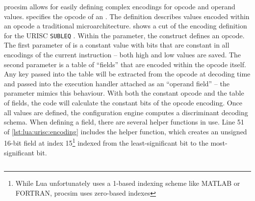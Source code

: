 procsim allows for easily defining complex encodings for opcode and operand values.  specifies the opcode of an . The  definition describes values encoded within an opcode a traditional microarchitecture.  shows a cut of the encoding definition for the URISC \verb|SUBLEQ| . Within the  parameter, the  construct defines an opcode. The first parameter of  is a constant value with bits that are constant in all encodings of the current instruction -- both high and low values are saved. The second parameter is a table of ``fields'' that are encoded within the opcode itself. Any key passed into the table will be extracted from the opcode at decoding time and passed into the execution handler attached as an ``operand field'' -- the  parameter mimics this behaviour. With both the constant opcode and the table of fields, the code will calculate the constant bits of the opcode encoding. Once all  values are defined, the configuration engine computes a discriminant decoding schema. When defining a field, there are several helper functions in use. Line 51 of \cref{lst:lua:urisc:encoding} includes the helper function,  which creates an unsigned 16-bit field at index 15\footnote{While Lua unfortunately uses a 1-based indexing scheme like MATLAB or FORTRAN, procsim uses zero-based indexes} indexed from the least-significant bit to the most-significant bit. 

\begin{listing}[h!]
    \inputminted[escapeinside=||, firstline=48, lastline=59]{lua}{./listings/urisc.lua}
    \caption{Encoding of the opcode and operands of the \texttt{SUBLEQ}  (cut from \cref{lst:lua:urisc-example-1}).}
    \label{lst:lua:urisc:encoding}
\end{listing}


